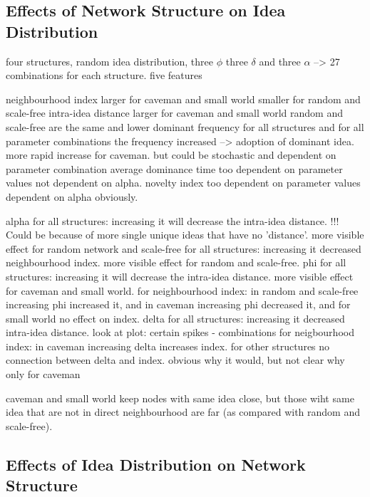 
\subsection{Effects of Network Structure on Idea Distribution}

four structures, random idea distribution, three $\phi$ three $\delta$ and three $\alpha$ --> 27 combinations for each structure. five features

neighbourhood index
	larger for caveman and small world
	smaller for random and scale-free
intra-idea distance
	larger for caveman and small world
	random and scale-free are the same and lower
dominant frequency
	for all structures and for all parameter combinations the frequency increased --> adoption of dominant idea.
	more rapid increase for caveman. but could be stochastic and dependent on parameter combination
average dominance time
	too dependent on parameter values
	not dependent on alpha.
novelty index
	too dependent on parameter values
	dependent on alpha obviously.

alpha
	for all structures: increasing it will decrease the intra-idea distance. !!! Could be because of more single unique ideas that have no 'distance'. more visible effect for random network and scale-free
	for all structures: increasing it decreased neighbourhood index. more visible effect for random and scale-free.
phi
	for all structures: increasing it will decrease the intra-idea distance. more visible effect for caveman and small world.
	for neighbourhood index: in random and scale-free increasing phi increased it, and in caveman increasing phi decreased it, and for small world no effect on index.
delta
	for all structures: increasing it decreased intra-idea distance. look at plot: certain spikes - combinations
	for neigbourhood index: in caveman increasing delta increases index. for other structures no connection between delta and index. obvious why it would, but not clear why only for caveman

caveman and small world keep nodes with same idea close, but those wiht same idea that are not in direct neighbourhood are far (as compared with random and scale-free).





\subsection{Effects of Idea Distribution on Network Structure}

